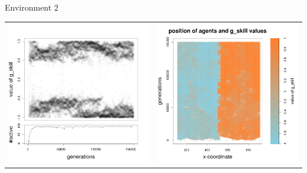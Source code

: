 \documentclass[8pt, handout=show,notes=show]{beamer}
\begin{document}
\begin{frame}{Environment 2}
\begin{table}[H]
\centering
\begin{tabular}{cc}
\includegraphics[width=\imgSize]{../images/5StaticEnv/Gplot22_staticEnv2}&\includegraphics[width=\imgSize]{../images/5StaticEnv/Gplot22Static_staticEnv2}\\

\end{tabular}
\end{table}
\end{frame}
\end{document}
